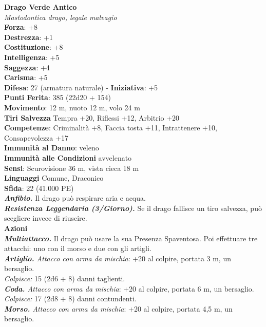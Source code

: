 \begin{multicols}{2}
\medskip\textbf{Drago Verde Antico}\\
\emph{Mastodontica drago, legale malvagio} \\
\textbf{Forza}: +8\\
\textbf{Destrezza}: +1\\
\textbf{Costituzione}: +8\\
\textbf{Intelligenza}: +5\\
\textbf{Saggezza}: +4\\
\textbf{Carisma}: +5\\
\textbf{Difesa}: 27 (armatura naturale) - \textbf{Iniziativa}: +5\\
\textbf{Punti Ferita}: 385 (22d20 + 154)\\
\textbf{Movimento}: 12 m, nuoto 12 m, volo 24 m\\
\textbf{Tiri Salvezza} Tempra +20, Riflessi +12, Arbitrio +20\\
\textbf{Competenze}: Criminalità +8, Faccia tosta +11, Intrattenere +10, Consapevolezza +17\\
\textbf{Immunità al Danno}: veleno\\
\textbf{Immunità alle Condizioni} avvelenato\\
\textbf{Sensi}: Scurovisione 36 m, vista cieca 18 m\\
\textbf{Linguaggi} Comune, Draconico\\
\textbf{Sfida}: 22 (41.000 PE)\smallskip\\
\emph{\textbf{Anfibio.}} Il drago può respirare aria e acqua.\\
\emph{\textbf{Resistenza Leggendaria (3/Giorno).}} Se il drago fallisce un tiro salvezza, può scegliere invece di riuscire.\\
\smallskip\textbf{Azioni}\\
\emph{\textbf{Multiattacco.}} Il drago può usare la sua Presenza Spaventosa. Poi effettuare tre attacchi: uno con il morso e due con gli artigli.\\
\emph{\textbf{Artiglio.} Attacco con arma da mischia}: +20 al colpire, portata 3 m, un bersaglio.\\
\emph{Colpisce:} 15 (2d6 + 8) danni taglienti.\\
\emph{\textbf{Coda.} Attacco con arma da mischia}: +20 al colpire, portata 6 m, un bersaglio.\\
\emph{Colpisce:} 17 (2d8 + 8) danni contundenti.\\
\emph{\textbf{Morso.} Attacco con arma da mischia}: +20 al colpire, portata 4,5 m, un bersaglio.\\

\end{multicols}
